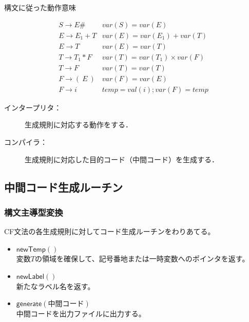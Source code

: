 \documentclass[dvipdfmx,cjk]{beamer}
\begin{document}
\begin{frame}{構文に従った動作意味}

  \[
    \begin{array}{ll}
      S\rightarrow E\# & var(S)= var(E)\\
      E\rightarrow E_1+T & var(E)= var(E_1)+var(T)\\
      E\rightarrow T & var(E)=var(T)\\
      T\rightarrow T_1\ast F & var(T)=var(T_1)\times var(F)\\
      T\rightarrow F & var(T)=var(T)\\
      F\rightarrow (\ E\ ) & var(F)=var(E)\\
      F\rightarrow i & temp=val(i);var(F)=temp
    \end{array}
  \]

  \vspace*{3mm}


  \begin{description}
  \item [インタープリタ：] 生成規則に対応する動作をする．
  \item [コンパイラ：] 生成規則に対応した目的コード（中間コード）を生成する．
  \end{description}
\end{frame}

\subsection{中間コード生成ルーチン}


\begin{frame}
 \frametitle{構文主導型変換}
 CF文法の各生成規則に対してコード生成ルーチンをわりあてる。\\
 \begin{itemize}
  \item $\mathsf{newTemp}()$\\
	変数$T$の領域を確保して、記号番地または一時変数へのポインタを返す。
  \item $\mathsf{newLabel}()$\\
	新たなラベル名を返す。
  \item $\mathsf{generate}(\mbox{中間コード})$\\
	中間コードを出力ファイルに出力する。
 \end{itemize}



\end{frame}
\end{document}

